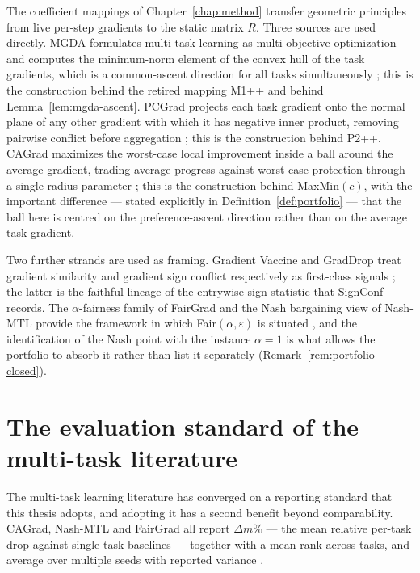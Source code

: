\documentclass[12pt,a4paper]{report}
\newcommand{\1}{\mathbf{1}}
\theoremstyle{definition}
\begin{document}
The coefficient mappings of Chapter~\ref{chap:method} transfer geometric principles from live per-step gradients to the static matrix \(R\). Three sources are used directly. MGDA formulates multi-task learning as multi-objective optimization and computes the minimum-norm element of the convex hull of the task gradients, which is a common-ascent direction for all tasks simultaneously \citep{sener2018mgda}; this is the construction behind the retired mapping M1++ and behind Lemma~\ref{lem:mgda-ascent}. PCGrad projects each task gradient onto the normal plane of any other gradient with which it has negative inner product, removing pairwise conflict before aggregation \citep{yu2020pcgrad}; this is the construction behind P2++. CAGrad maximizes the worst-case local improvement inside a ball around the average gradient, trading average progress against worst-case protection through a single radius parameter \citep{liu2021cagrad}; this is the construction behind MaxMin\((c)\), with the important difference --- stated explicitly in Definition~\ref{def:portfolio} --- that the ball here is centred on the preference-ascent direction rather than on the average task gradient.

Two further strands are used as framing. Gradient Vaccine and GradDrop treat gradient similarity and gradient sign conflict respectively as first-class signals \citep{wang2021gradvac,chen2020graddrop}; the latter is the faithful lineage of the entrywise sign statistic that SignConf records. The \(\alpha\)-fairness family of FairGrad and the Nash bargaining view of Nash-MTL provide the framework in which Fair\((\alpha,\varepsilon)\) is situated \citep{ban2024fairgrad,navon2022nashmtl}, and the identification of the Nash point with the instance \(\alpha=1\) is what allows the portfolio to absorb it rather than list it separately (Remark~\ref{rem:portfolio-closed}).

\section{The evaluation standard of the multi-task literature}
\label{sec:related-deltam}

The multi-task learning literature has converged on a reporting standard that this thesis adopts, and adopting it has a second benefit beyond comparability. CAGrad, Nash-MTL and FairGrad all report \(\Delta m\%\) --- the mean relative per-task drop against single-task baselines --- together with a mean rank across tasks, and average over multiple seeds with reported variance \citep{liu2021cagrad,navon2022nashmtl,ban2024fairgrad}.
\end{document}
